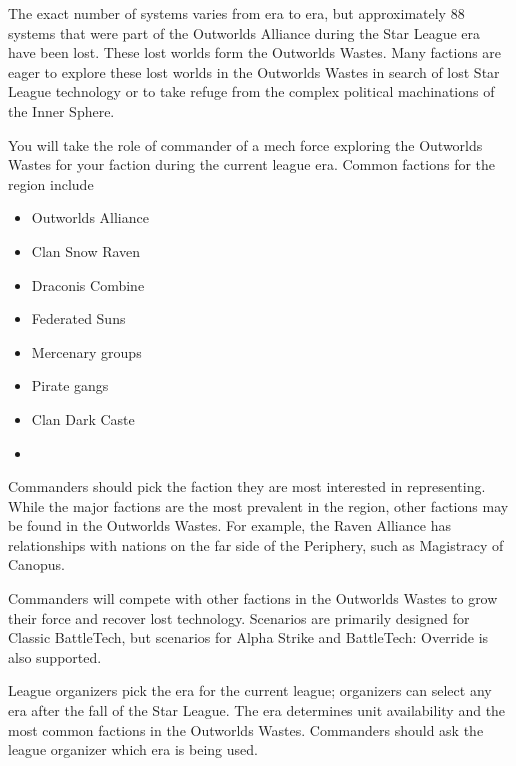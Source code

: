 \documentclass{article}
\begin{document}
The exact number of systems varies from era to era, but approximately 88 systems that were part of the Outworlds Alliance during the Star League era have been lost.
These lost worlds form the Outworlds Wastes.
Many factions are eager to explore these lost worlds in the Outworlds Wastes in search of lost Star League technology or to take refuge from the complex political machinations of the Inner Sphere.

You will take the role of commander of a mech force exploring the Outworlds Wastes for your faction during the current league era.
Common factions for the region include

\begin{multicols}{2}

\begin{itemize}

\item Outworlds Alliance

\item Clan Snow Raven

\item Draconis Combine

\item Federated Suns

\item Mercenary groups

\item Pirate gangs

\item Clan Dark Caste

\item[\vspace{\fill}]

\end{itemize}

\end{multicols}

Commanders should pick the faction they are most interested in representing.
While the major factions are the most prevalent in the region, other factions may be found in the Outworlds Wastes.
For example, the Raven Alliance has relationships with nations on the far side of the Periphery, such as Magistracy of Canopus.

Commanders will compete with other factions in the Outworlds Wastes to grow their force and recover lost technology.
Scenarios are primarily designed for Classic BattleTech, but scenarios for Alpha Strike and BattleTech: Override is also supported.

League organizers pick the era for the current league; organizers can select any era after the fall of the Star League.
The era determines unit availability and the most common factions in the Outworlds Wastes.
Commanders should ask the league organizer which era is being used.
\end{document}
